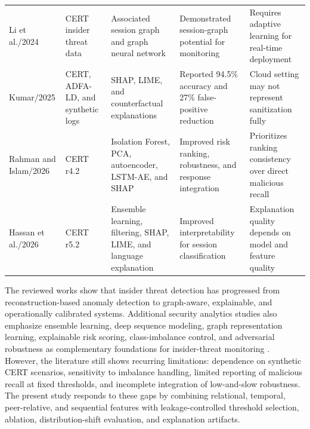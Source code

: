 \documentclass[journal]{IEEEtran}
\begin{document}
\begin{table}[!tbp]
\begin{tabular}{p{}p{}p{}p{}p{}}
Li et al./2024 \cite{asg2024} & CERT insider threat data & Associated session graph and graph neural network & Demonstrated session-graph potential for monitoring & Requires adaptive learning for real-time deployment \\
Kumar/2025 \cite{cloudxai2025} & CERT, ADFA-LD, and synthetic logs & SHAP, LIME, and counterfactual explanations & Reported 94.5\% accuracy and 27\% false-positive reduction & Cloud setting may not represent sanitization fully \\
Rahman and Islam/2026 \cite{aibitd2026} & CERT r4.2 & Isolation Forest, PCA, autoencoder, LSTM-AE, and SHAP & Improved risk ranking, robustness, and response integration & Prioritizes ranking consistency over direct malicious recall \\
Hassan et al./2026 \cite{illuminating2026} & CERT r5.2 & Ensemble learning, filtering, SHAP, LIME, and language explanation & Improved interpretability for session classification & Explanation quality depends on model and feature quality \\
\bottomrule
\end{tabular}
\end{table}

The reviewed works show that insider threat detection has progressed from reconstruction-based anomaly detection to graph-aware, explainable, and operationally calibrated systems. Additional security analytics studies also emphasize ensemble learning, deep sequence modeling, graph representation learning, explainable risk scoring, class-imbalance control, and adversarial robustness as complementary foundations for insider-threat monitoring \cite{ghosh2021survey,le2021log,nguyen2021xai,shen2022sequence,wang2022graph,ahmad2022cyberxai,patel2023ensemble,kim2023bertlogs,chen2024federated,park2024zero,garcia2025adaptive,okafor2025privacy,zhou2026trustworthy,ibrahim2026soc}. However, the literature still shows recurring limitations: dependence on synthetic CERT scenarios, sensitivity to imbalance handling, limited reporting of malicious recall at fixed thresholds, and incomplete integration of low-and-slow robustness. The present study responds to these gaps by combining relational, temporal, peer-relative, and sequential features with leakage-controlled threshold selection, ablation, distribution-shift evaluation, and explanation artifacts.


\end{document}
